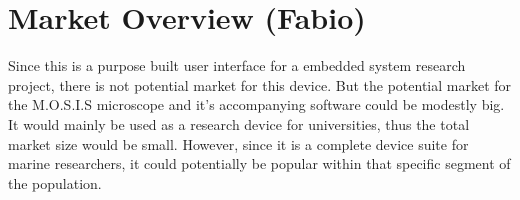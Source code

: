 \section{Market Overview (Fabio)}
Since this is a purpose built user interface for a embedded system research project, there is not potential market for this device. But the potential market for the M.O.S.I.S microscope and it's accompanying software could be modestly big. It would mainly be used as a research device for universities, thus the total market size would be small. However, since it is a complete device suite for marine researchers, it could potentially be popular within that specific segment of the population.